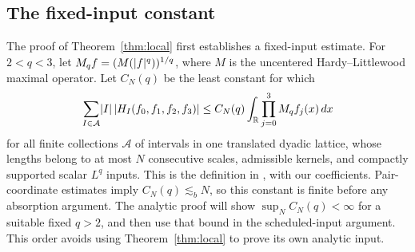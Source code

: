 \subsection{The fixed-input constant}
The proof of Theorem~\ref{thm:local} first establishes a fixed-input
estimate. For $2<q<3$, let $M_q f=(M(\lvert f\rvert^q))^{1/q}$, where $M$
is the uncentered Hardy--Littlewood maximal operator. Let $C_N(q)$
be the least constant for which
\begin{equation}\label{eq:CN}
 \sum_{I\in\mathcal A}\lvert I\rvert\,\lvert H_I(f_0,f_1,f_2,f_3)\rvert
 \le C_N(q)\int_\mathbb R\prod_{j=0}^3M_qf_j(x)\,dx
\end{equation}
for all finite collections $\mathcal A$ of intervals in one translated
dyadic lattice, whose lengths belong to at most $N$ consecutive scales,
admissible kernels, and compactly supported
scalar $L^q$ inputs. This is the definition in
\cite[Section~2]{H}, with our coefficients.
Pair-coordinate estimates imply $C_N(q)\lesssim_bN$, so this constant
is finite before any absorption argument. The analytic proof will show
$\sup_NC_N(q)<\infty$ for a suitable fixed $q>2$, and then use that
bound in the scheduled-input argument. This order avoids using
Theorem~\ref{thm:local} to prove its own analytic input.
